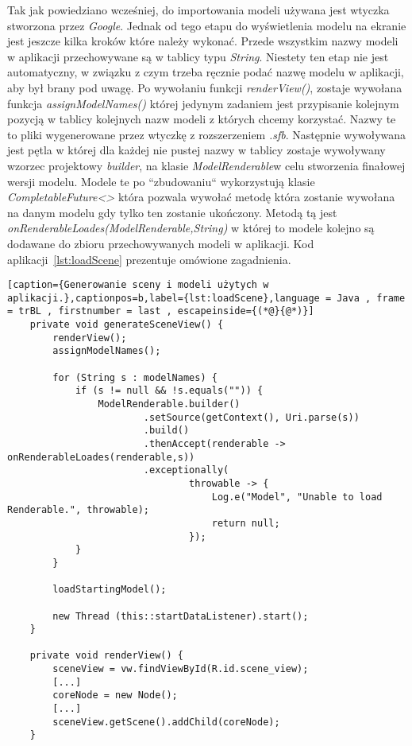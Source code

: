 Tak jak powiedziano wcześniej, do importowania modeli używana jest wtyczka stworzona przez \textit{Google}. Jednak od tego etapu do wyświetlenia modelu na ekranie jest jeszcze kilka kroków które należy wykonać. Przede wszystkim nazwy modeli w aplikacji przechowywane są w tablicy typu \textit{String}. Niestety ten etap nie jest automatyczny, w związku z czym trzeba ręcznie podać nazwę modelu w aplikacji, aby był brany pod uwagę. Po wywołaniu funkcji \textit{renderView()}, zostaje wywołana funkcja \textit{assignModelNames()} której jedynym zadaniem jest przypisanie kolejnym pozycją w tablicy kolejnych nazw modeli z których chcemy korzystać. Nazwy te to pliki wygenerowane przez wtyczkę z rozszerzeniem \textit{.sfb}. Następnie wywoływana jest pętla w której dla każdej nie pustej nazwy w tablicy zostaje wywoływany wzorzec projektowy \textit{builder}, na klasie \textit{ModelRenderable}w celu stworzenia finałowej wersji modelu. Modele te po ``zbudowaniu`` wykorzystują klasie \textit{CompletableFuture<>} która pozwala wywołać metodę która zostanie wywołana na danym modelu gdy tylko ten zostanie ukończony. Metodą tą jest \textit{onRenderableLoades(ModelRenderable,String)} w której to modele kolejno są dodawane do zbioru przechowywanych modeli w aplikacji. Kod aplikacji~\ref{lst:loadScene} prezentuje omówione zagadnienia.
\begin{lstlisting}[caption={Generowanie sceny i modeli użytych w aplikacji.},captionpos=b,label={lst:loadScene},language = Java , frame = trBL , firstnumber = last , escapeinside={(*@}{@*)}]     
 	private void generateSceneView() {
        renderView();
        assignModelNames();

        for (String s : modelNames) {
            if (s != null && !s.equals("")) {
                ModelRenderable.builder()
                        .setSource(getContext(), Uri.parse(s))
                        .build()
                        .thenAccept(renderable -> onRenderableLoades(renderable,s))
                        .exceptionally(
                                throwable -> {
                                    Log.e("Model", "Unable to load Renderable.", throwable);
                                    return null;
                                });
            }
        }

        loadStartingModel();

        new Thread (this::startDataListener).start();
    }

    private void renderView() {
        sceneView = vw.findViewById(R.id.scene_view);
        [...]
        coreNode = new Node();
		[...]
        sceneView.getScene().addChild(coreNode);
    }                                             
\end{lstlisting}

